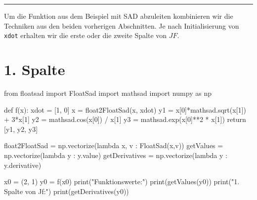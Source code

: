 \documentclass[
  a4paper,
  DIV=11]{scrreprt}
\newenvironment{Shaded}{\begin{snugshade}}{\end{snugshade}}
\newcommand{\BuiltInTok}[1]{\textcolor[rgb]{0.00,0.23,0.31}{#1}}
\newcommand{\ControlFlowTok}[1]{\textcolor[rgb]{0.00,0.23,0.31}{#1}}
\newcommand{\DecValTok}[1]{\textcolor[rgb]{0.68,0.00,0.00}{#1}}
\newcommand{\ImportTok}[1]{\textcolor[rgb]{0.00,0.46,0.62}{#1}}
\newcommand{\KeywordTok}[1]{\textcolor[rgb]{0.00,0.23,0.31}{#1}}
\newcommand{\NormalTok}[1]{\textcolor[rgb]{0.00,0.23,0.31}{#1}}
\newcommand{\OperatorTok}[1]{\textcolor[rgb]{0.37,0.37,0.37}{#1}}
\newcommand{\StringTok}[1]{\textcolor[rgb]{0.13,0.47,0.30}{#1}}
\theoremstyle{definition}
\theoremstyle{definition}
\theoremstyle{remark}
\begin{document}
\begin{center}\rule{0.5\linewidth}{0.5pt}\end{center}

Um die Funktion aus dem Beispiel mit SAD abzuleiten kombinieren wir die
Techniken aus den beiden vorherigen Abschnitten. Je nach Initialisierung
von \texttt{xdot} erhalten wir die erste oder die zweite Spalte von
\(JF\).

\section{1. Spalte}

\begin{Shaded}
\begin{Highlighting}[]
\ImportTok{from}\NormalTok{ floatsad }\ImportTok{import}\NormalTok{ FloatSad}
\ImportTok{import}\NormalTok{ mathsad}
\ImportTok{import}\NormalTok{ numpy }\ImportTok{as}\NormalTok{ np}

\KeywordTok{def}\NormalTok{ f(x):}
\NormalTok{    xdot }\OperatorTok{=}\NormalTok{ [}\DecValTok{1}\NormalTok{, }\DecValTok{0}\NormalTok{]}
\NormalTok{    x }\OperatorTok{=}\NormalTok{ float2FloatSad(x, xdot)}
\NormalTok{    y1 }\OperatorTok{=}\NormalTok{ x[}\DecValTok{0}\NormalTok{]}\OperatorTok{*}\NormalTok{mathsad.sqrt(x[}\DecValTok{1}\NormalTok{]) }\OperatorTok{+} \DecValTok{3}\OperatorTok{*}\NormalTok{x[}\DecValTok{1}\NormalTok{]}
\NormalTok{    y2 }\OperatorTok{=}\NormalTok{ mathsad.cos(x[}\DecValTok{0}\NormalTok{]) }\OperatorTok{/}\NormalTok{ x[}\DecValTok{1}\NormalTok{]}
\NormalTok{    y3 }\OperatorTok{=}\NormalTok{ mathsad.exp(x[}\DecValTok{0}\NormalTok{]}\OperatorTok{**}\DecValTok{2} \OperatorTok{*}\NormalTok{ x[}\DecValTok{1}\NormalTok{])}
    \ControlFlowTok{return}\NormalTok{ [y1, y2, y3]    }


\NormalTok{float2FloatSad }\OperatorTok{=}\NormalTok{ np.vectorize(}\KeywordTok{lambda}\NormalTok{ x, v : FloatSad(x,v))}
\NormalTok{getValues }\OperatorTok{=}\NormalTok{ np.vectorize(}\KeywordTok{lambda}\NormalTok{ y : y.value)}
\NormalTok{getDerivatives }\OperatorTok{=}\NormalTok{ np.vectorize(}\KeywordTok{lambda}\NormalTok{ y : y.derivative)}


\NormalTok{x0 }\OperatorTok{=}\NormalTok{ (}\DecValTok{2}\NormalTok{, }\DecValTok{1}\NormalTok{)}
\NormalTok{y0 }\OperatorTok{=}\NormalTok{ f(x0)}
\BuiltInTok{print}\NormalTok{(}\StringTok{"Funktionswerte:"}\NormalTok{)}
\BuiltInTok{print}\NormalTok{(getValues(y0))}
\BuiltInTok{print}\NormalTok{(}\StringTok{"1. Spalte von Jf:"}\NormalTok{)}
\BuiltInTok{print}\NormalTok{(getDerivatives(y0))}
\end{Highlighting}
\end{Shaded}
\end{document}
